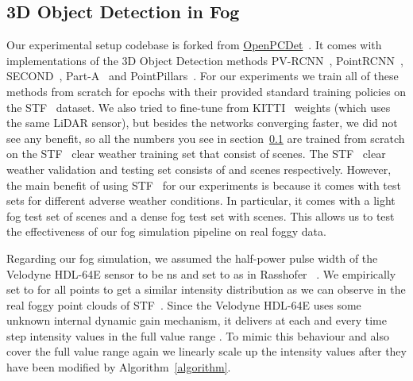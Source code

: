 \documentclass[10pt,twocolumn,letterpaper]{article}
\begin{document}
\subsection{3D Object Detection in Fog}
\label{sec:setup}

Our experimental setup codebase is forked from \hyperlink{https://github.com/open-mmlab/OpenPCDet}{OpenPCDet}~\cite{openpcdet2020}. 
It comes with implementations of the 3D Object Detection methods PV-RCNN~\cite{PV-RCNN}, PointRCNN~\cite{PRCNN}, SECOND~\cite{SECOND}, Part-A~\cite{PartA2} and PointPillars~\cite{PP}.
For our experiments we train all of these methods from scratch for  epochs with their provided standard training policies on the STF~\cite{STF} dataset. 
We also tried to fine-tune from KITTI~\cite{KITTI} weights (which uses the same LiDAR sensor), but besides the networks converging faster, we did not see any benefit, so all the numbers you see in section~\ref{sec:setup} are trained from scratch on the STF~\cite{STF} clear weather training set that consist of  scenes.
The STF~\cite{STF} clear weather validation and testing set consists of  and  scenes respectively. 
However, the main benefit of using STF~\cite{STF} for our experiments is because it comes with test sets for different adverse weather conditions. 
In particular, it comes with a light fog test set of  scenes and a dense fog test set with  scenes. 
This allows us to test the effectiveness of our fog simulation pipeline on real foggy data. 

Regarding our fog simulation, we assumed the half-power pulse width  of the Velodyne HDL-64E sensor to be ns and set  to  as in Rasshofer \etal~\cite{Rasshofer_2011}. We empirically set  to  for all points to get a similar intensity distribution as we can observe in the real foggy point clouds of STF~\cite{STF}. Since the Velodyne HDL-64E uses some unknown internal dynamic gain mechanism, it delivers at each and every time step intensity values in the full value range . To mimic this behaviour and also cover the full value range again we linearly scale up the intensity values after they have been modified by Algorithm~\ref{algorithm}. 
\end{document}
